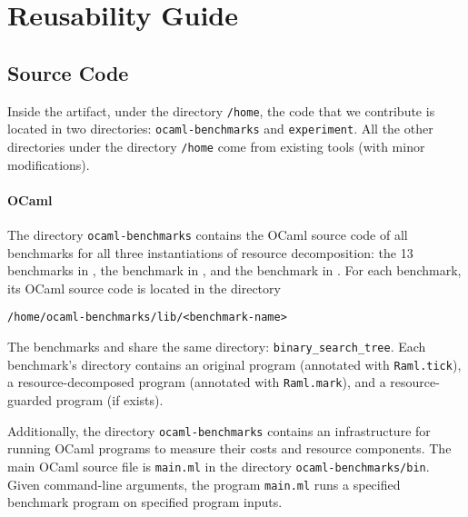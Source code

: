 
\section{Reusability Guide}
\label{sec:reusability-guide}

\subsection{Source Code}

Inside the artifact, under the directory \texttt{/home}, the code that we
contribute is located in two directories: \texttt{ocaml-benchmarks} and
\texttt{experiment}.
%
All the other directories under the directory \texttt{/home} come from existing
tools (with minor modifications).

\paragraph{OCaml}

The directory \texttt{ocaml-benchmarks} contains the OCaml source code of all
benchmarks for all three instantiations of resource decomposition: the 13
benchmarks in , the benchmark \kruskal{}
in , and the benchmark
\quicksorttiml{}\footnotemark in .
%
For each benchmark, its OCaml source code is located in the directory
\begin{verbatim}
/home/ocaml-benchmarks/lib/<benchmark-name>
\end{verbatim}
%
The benchmarks \unbalancedbst{} and \balancedbst{} share the same directory:
\texttt{binary\_search\_tree}.
%
Each benchmark's directory contains an original program (annotated with
\texttt{Raml.tick}), a resource-decomposed program (annotated with
\texttt{Raml.mark}), and a resource-guarded program (if exists).
%

Additionally, the directory \texttt{ocaml-benchmarks} contains an infrastructure
for running OCaml programs to measure their costs and resource components.
%
The main OCaml source file is \texttt{main.ml} in the directory
\texttt{ocaml-benchmarks/bin}.
%
Given command-line arguments, the program \texttt{main.ml} runs a specified
benchmark program on specified program inputs.


